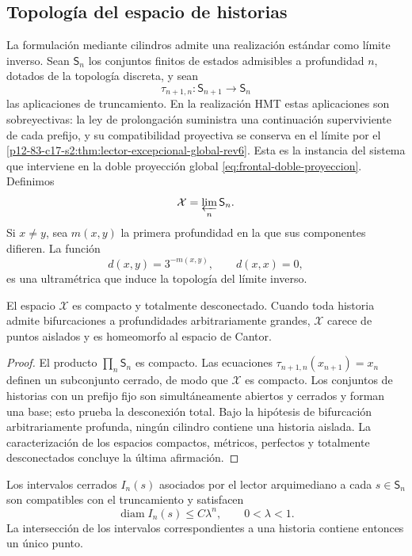 \subsection{Topología del espacio de historias}

La formulación mediante cilindros admite una realización estándar como
límite inverso. Sean \(\mathsf S_n\) los conjuntos finitos de estados
admisibles a profundidad \(n\), dotados de la topología discreta, y sean
\[
 \tau_{n+1,n}:\mathsf S_{n+1}\longrightarrow\mathsf S_n
\]
las aplicaciones de truncamiento. En la realización HMT estas aplicaciones
son sobreyectivas: la ley de prolongación suministra una continuación
superviviente de cada prefijo, y su compatibilidad proyectiva se conserva en
el límite por el
\cref{p12-83-c17-s2:thm:lector-excepcional-global-rev6}. Esta es la instancia
del sistema que interviene en la doble proyección global
\eqref{eq:frontal-doble-proyeccion}. Definimos
\[
 \mathcal X=\varprojlim_n\mathsf S_n.
\]
Si \(x\ne y\), sea \(m(x,y)\) la primera profundidad en la que sus
componentes difieren. La función
\[
 d(x,y)=3^{-m(x,y)},\qquad d(x,x)=0,
\]
es una ultramétrica que induce la topología del límite inverso.

\begin{theorem}
\label{p12-83-c17-s1:thm:compacto-historias}
\label{thm:compacto-historias}
El espacio \(\mathcal X\) es compacto y totalmente desconectado. Cuando
toda historia admite bifurcaciones a profundidades arbitrariamente grandes,
\(\mathcal X\) carece de puntos aislados y es homeomorfo al espacio de
Cantor.
\end{theorem}

\begin{proof}
El producto \(\prod_n\mathsf S_n\) es compacto. Las ecuaciones
\(\tau_{n+1,n}(x_{n+1})=x_n\) definen un subconjunto cerrado, de modo que
\(\mathcal X\) es compacto. Los conjuntos de historias con un prefijo fijo
son simultáneamente abiertos y cerrados y forman una base; esto prueba la
desconexión total. Bajo la hipótesis de bifurcación arbitrariamente profunda,
ningún cilindro contiene una historia aislada. La caracterización de los
espacios compactos, métricos, perfectos y totalmente desconectados concluye
la última afirmación.
\end{proof}

Los intervalos cerrados \(I_n(s)\) asociados por el lector arquimediano a
cada \(s\in\mathsf S_n\) son compatibles con el truncamiento y satisfacen
\[
 \operatorname{diam}I_n(s)\leq C\lambda^n,
 \qquad 0<\lambda<1.
\]
La intersección de los intervalos correspondientes a una historia contiene
entonces un único punto.

